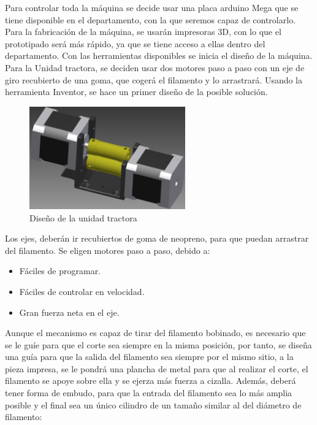 Para controlar toda la máquina se decide usar una placa arduino Mega que se tiene disponible en el departamento, con la que seremos capaz de controlarlo. Para la fabricación de la máquina, se usarán impresoras 3D, con lo que el prototipado será más rápido, ya que se tiene acceso a ellas dentro del departamento. Con las herramientas disponibles se inicia el diseño de la máquina.\\

Para la Unidad tractora, se deciden usar dos motores paso a paso con un eje de giro recubierto de una goma, que cogerá el filamento y lo arrastrará. Usando la herramienta Inventor, se hace un primer diseño de la posible solución.

    \begin{figure}[H]
            \centering
            \includegraphics[width=0.6\textwidth]{images/peletizadora/unidadtractora.png}
            \caption{Diseño de la unidad tractora}
            \label{fig:peletizadora_tractora}
    \end{figure}

Los ejes, deberán ir recubiertos de goma de neopreno, para que puedan arrastrar del filamento. Se eligen motores paso a paso, debido a:

\begin{itemize}
	\item{Fáciles de programar.}
	\item{Fáciles de controlar en velocidad.}
	\item{Gran fuerza neta en el eje.}
\end{itemize}

Aunque el mecanismo es capaz de tirar del filamento bobinado, es necesario que se le guíe para que el corte sea siempre en la misma posición, por tanto, se diseña una guía para que la salida del filamento sea siempre por el mismo sitio, a la pieza impresa, se le pondrá una plancha de metal para que al realizar el corte, el filamento se apoye sobre ella y se ejerza más fuerza a cizalla. Además, deberá tener forma de embudo, para que la entrada del filamento sea lo más amplia posible y el final sea un único cilindro de un tamaño similar al del diámetro de filamento:

